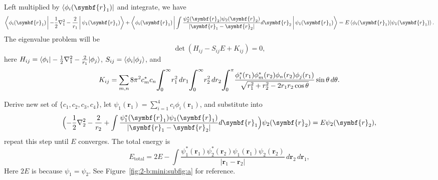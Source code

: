 Left multiplied by $\bra{\phi_i(\symbf{r}_1)}$ and integrate, we have
%
\begin{equation}
    \begin{aligned}
        \Braket{\phi_i(\symbf{r}_1) | - \frac{1}{2}\nabla_1^2 - \frac{2}{r_1} | \psi_1(\symbf{r}_1)} +
        \Braket{\phi_i(\symbf{r}_1) |
            \int \frac{\psi_2^\ast(\symbf{r}_2)\psi_2(\symbf{r}_2)}{\lvert \symbf{r}_1 - \symbf{r}_2 \rvert} d\symbf{r}_2 |
            \psi_1(\symbf{r}_1)}
        = E \braket{\phi_i(\symbf{r}_1) | \psi_1(\symbf{r}_1)}.
    \end{aligned}
\end{equation}
%
The eigenvalue problem will be
%
\begin{equation}
    \det (H_{ij} - S_{ij} E + K_{ij}) = 0,
\end{equation}
%
here $H_{ij} = \braket{\phi_i | - \frac{1}{2}\nabla_1^2 - \frac{2}{r_1} | \phi_j}$,
$S_{ij} = \braket{\phi_i | \phi_j}$, and
%
\begin{equation}
    K_{ij} = \sum_{m, n} 8\pi^2 c_m^\ast c_n
    \scaleint{7ex}_{\bs 0}^{\infty} r_1^2 \, dr_1
    \scaleint{7ex}_{\bs 0}^{\infty} r_2^2 \, dr_2
    \scaleint{7ex}_{\bs 0}^{\pi}
    \frac{\phi_i^\ast(r_1) \phi_m^\ast(r_2) \phi_n(r_2)\phi_j(r_1)}{\sqrt{r_1^2 + r_2^2 - 2 r_1 r_2 \cos\theta}}
    \sin\theta\, d\theta.
\end{equation}

Derive new set of $\{c_1, c_2, c_3, c_4\}$,
let $\psi_1(\symbf{r}_1) = \sum_{i=1}^{4} c_i \phi_i(\symbf{r}_1)$, and substitute into
%
\begin{equation}
    \Bigl(
    -\frac{1}{2}\nabla_2^2 - \frac{2}{r_2} +
    \int \frac{\psi_1^\ast(\symbf{r}_1)\psi_1(\symbf{r}_1)}{\lvert \symbf{r}_1 - \symbf{r}_2 \rvert} d\symbf{r}_1
    \Bigr)
    \psi_2(\symbf{r}_2) = E \psi_2 (\symbf{r}_2),
\end{equation}
%
repeat this step until $E$ converges. The total energy is
%
\begin{equation}
    E_{\text{total}} = 2E -
    \int \frac{\psi_1^\ast(\symbf{r}_1)\psi_2^\ast(\symbf{r}_2) \psi_1(\symbf{r}_1)
        \psi_2(\symbf{r}_2)}{\lvert \symbf{r}_1 - \symbf{r}_2 \rvert}
    \, d\symbf{r}_2 \, d\symbf{r}_1,
\end{equation}
%
Here $2E$ is because $\psi_1 = \psi_2$. See Figure~\ref{fig:2-b:mini:subfig:a} for reference.

